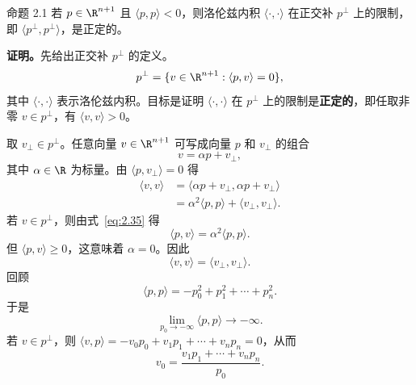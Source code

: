 \begin{statement}{命题 2.1}{}
若 $p\in\R^{n+1}$ 且 $\langle p,p\rangle<0$，则洛伦兹内积 $\langle\cdot,\cdot\rangle$ 在正交补 $p^\perp$ 上的限制，即 $\langle p^\perp,p^\perp\rangle$，是正定的。

\textbf{证明。}先给出正交补 $p^\perp$ 的定义。
\[
  p^\perp=\{v\in\R^{n+1}:\langle p,v\rangle=0\},
\]
其中 $\langle\cdot,\cdot\rangle$ 表示洛伦兹内积。目标是证明 $\langle\cdot,\cdot\rangle$ 在 $p^\perp$ 上的限制是\textbf{正定的}，即任取非零 $v\in p^\perp$，有 $\langle v,v\rangle>0$。

取 $v_\perp\in p^\perp$。任意向量 $v\in\R^{n+1}$ 可写成向量 $p$ 和 $v_\perp$ 的组合
\begin{equation*}
  v=\alpha p+v_\perp,
  \tag{2.35}\label{eq:2.35}
\end{equation*}
其中 $\alpha\in\R$ 为标量。由 $\langle p,v_\perp\rangle=0$ 得
\begin{equation*}
  \begin{aligned}
    \langle v,v\rangle
      &=\langle\alpha p+v_\perp,\alpha p+v_\perp\rangle\\
      &=\alpha^2\langle p,p\rangle+\langle v_\perp,v_\perp\rangle.
  \end{aligned}
  \tag{2.36}\label{eq:2.36}
\end{equation*}
若 $v\in p^\perp$，则由式~\eqref{eq:2.35} 得
\begin{equation*}
  \langle p,v\rangle=\alpha^2\langle p,p\rangle.
  \tag{2.37}\label{eq:2.37}
\end{equation*}
但 $\langle p,v\rangle\geq0$，这意味着 $\alpha=0$。因此
\begin{equation*}
  \langle v,v\rangle=\langle v_\perp,v_\perp\rangle.
  \tag{2.38}\label{eq:2.38}
\end{equation*}
回顾
\begin{equation*}
  \langle p,p\rangle=-p_0^2+p_1^2+\cdots+p_n^2.
  \tag{2.39}\label{eq:2.39}
\end{equation*}
于是
\begin{equation*}
  \lim_{p_0\to-\infty}\langle p,p\rangle\longrightarrow-\infty.
  \tag{2.40}\label{eq:2.40}
\end{equation*}
若 $v\in p^\perp$，则 $\langle v,p\rangle=-v_0p_0+v_1p_1+\cdots+v_np_n=0$，从而
\begin{equation*}
  v_0=\frac{v_1p_1+\cdots+v_np_n}{p_0}.
  \tag{2.41}\label{eq:2.41}
\end{equation*}


\end{statement}
